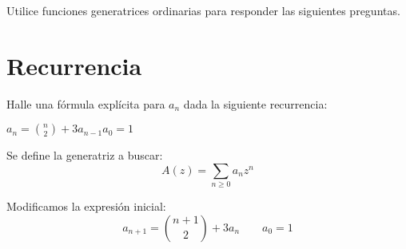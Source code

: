 \documentclass[spanish, fleqn]{article}
\title{Estructuras Discretas \\
	Tarea \#\num \\
	``Cómo aprender a generar en una tarde''}
\author{Andrés Navarro \\ (201673001-K)}
\date{}
\begin{document}
	\maketitle
	\thispagestyle{empty}
	
    Utilice funciones generatrices ordinarias para responder las siguientes preguntas.
    
	\section{Recurrencia}
	Halle una fórmula explícita para \(a_n\) dada la siguiente recurrencia:
	
    $a_n = \binom{n}{2}+ 3a_{n-1} a_{0}=1$
    
    Se define la generatriz a buscar:
    \begin{equation*}
    A(z) = \sum_{n \geqslant 0} a_n z^n
    \end{equation*}
	
	Modificamos la expresión inicial:
	\begin{equation*}
	a_{n+1} = \binom{n+1}{2} + 3a_{n} \qquad a_{0}=1
	\end{equation*}
	
\end{document}

